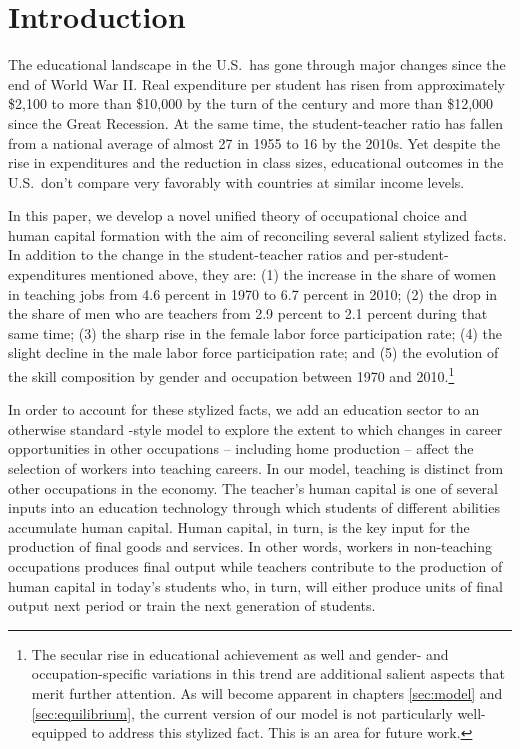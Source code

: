 \documentclass[onehalfspacing,11pt]{article}
\begin{document}
\section{Introduction}
The educational landscape in the U.S.~has gone through major changes since the end of World War II. Real expenditure per student has risen from approximately \$2,100 to more than \$10,000 by the turn of the century and more than \$12,000 since the Great Recession. At the same time, the student-teacher ratio has fallen from a national average of almost 27 in 1955 to 16 by the 2010s. Yet despite the rise in expenditures and the reduction in class sizes, educational outcomes in the U.S.~don't compare very favorably with countries at similar income levels.

In this paper, we develop a novel unified theory of occupational choice and human capital formation with the aim of reconciling several salient stylized facts. In addition to the change in the student-teacher ratios and per-student-expenditures mentioned above, they are: (1) the increase in the share of women in teaching jobs from 4.6 percent in 1970 to 6.7 percent in 2010; (2) the drop in the share of men who are teachers from 2.9 percent to 2.1 percent during that same time; (3) the sharp rise in the female labor force participation rate; (4) the slight decline in the male labor force participation rate; and (5) the evolution of the skill composition by gender and occupation between 1970 and 2010.\footnote{The secular rise in educational achievement as well and gender- and occupation-specific variations in this trend are additional salient aspects that merit further attention. As will become apparent in chapters \ref{sec:model} and \ref{sec:equilibrium}, the current version of our model is not particularly well-equipped to address this stylized fact. This is an area for future work.}

In order to account for these stylized facts, we add an education sector to an otherwise standard \cite{Hsieh:2018}-style model to explore the extent to which changes in career opportunities in other occupations -- including home production -- affect the selection of workers into teaching careers. In our model, teaching is distinct from other occupations in the economy. The teacher's human capital is one of several inputs into an education technology through which students of different abilities accumulate human capital. Human capital, in turn, is the key input for the production of final goods and services. In other words, workers in non-teaching occupations produces final output while teachers contribute to the production of human capital in today's students who, in turn, will either produce units of final output next period or train the next generation of students.%
\end{document}
